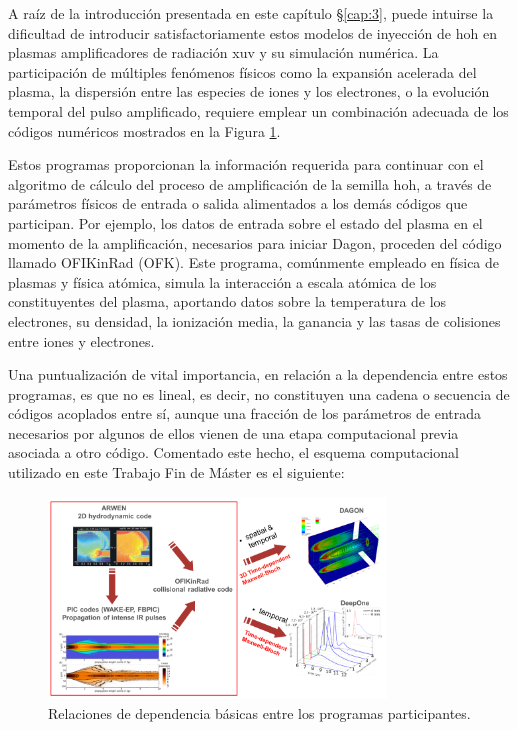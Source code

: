 A raíz de la introducción presentada en este capítulo \S\ref{cap:3}, puede intuirse la dificultad de introducir satisfactoriamente estos modelos de inyección de \acrshort{hoh} en plasmas amplificadores de radiación \acrshort{xuv} y su simulación numérica. La participación de múltiples fenómenos físicos como la expansión acelerada del plasma, la dispersión entre las especies de iones y los electrones, o la evolución temporal del pulso amplificado, requiere emplear un combinación adecuada de los códigos numéricos mostrados en la Figura \ref{fig:3.2}.

Estos programas proporcionan la información requerida para continuar con el algoritmo de cálculo del proceso de amplificación de la semilla \acrshort{hoh}, a través de parámetros físicos de entrada o salida alimentados a los demás códigos que participan. Por ejemplo, los datos de entrada sobre el estado del plasma en el momento de la amplificación, necesarios para iniciar Dagon, proceden del código llamado OFIKinRad (OFK). Este programa, comúnmente empleado en física de plasmas y física atómica, simula la interacción a escala atómica de los constituyentes del plasma, aportando datos sobre la temperatura de los electrones, su densidad, la ionización media, la ganancia y las tasas de colisiones entre iones y electrones. 

Una puntualización de vital importancia, en relación a la dependencia entre estos programas, es que no es lineal, es decir, no constituyen una cadena o secuencia de códigos acoplados entre sí, aunque una fracción de los parámetros de entrada necesarios por algunos de ellos vienen de una etapa computacional previa asociada a otro código. Comentado este hecho, el esquema computacional utilizado en este Trabajo Fin de Máster es el siguiente:

\begin{figure}[htbp]
  \centering
  \includegraphics[width=0.8\textwidth]{Figuras/ch3_codig.png}
  \caption{Relaciones de dependencia básicas entre los programas participantes. \autocite{Gil2021}}
  \label{fig:3.2}
\end{figure}


